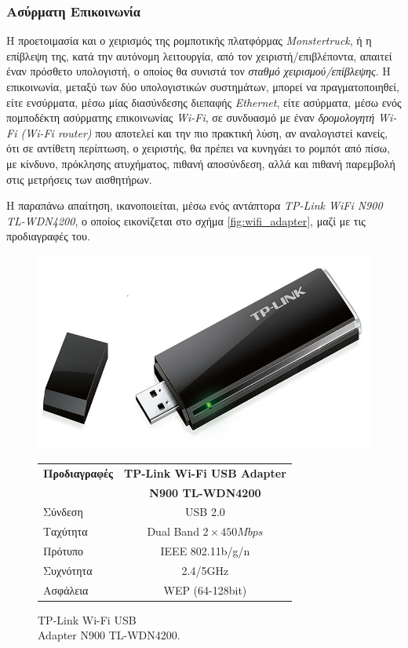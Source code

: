 \bigskip
\subsubsection{Ασύρματη Επικοινωνία}
Η προετοιμασία και ο χειρισμός της ρομποτικής πλατφόρμας \textit{Monstertruck}, ή η επίβλεψη της, κατά την αυτόνομη λειτουργία, από τον χειριστή/επιβλέποντα, απαιτεί έναν πρόσθετο υπολογιστή, ο οποίος θα συνιστά τον \textit{σταθμό χειρισμού/επίβλεψης}. Η επικοινωνία, μεταξύ των δύο υπολογιστικών συστημάτων, μπορεί να πραγματοποιηθεί, είτε ενσύρματα, μέσω μίας διασύνδεσης διεπαφής \textit{Ethernet}, είτε ασύρματα, μέσω ενός πομποδέκτη ασύρματης επικοινωνίας \textit{Wi-Fi}, σε συνδυασμό με έναν \textit{δρομολογητή Wi-Fi (Wi-Fi router)} που αποτελεί και την πιο πρακτική λύση, αν αναλογιστεί κανείς, ότι σε αντίθετη περίπτωση, ο χειριστής, θα πρέπει να κυνηγάει το ρομπότ από πίσω, με κίνδυνο, πρόκλησης ατυχήματος, πιθανή αποσύνδεση, αλλά και πιθανή παρεμβολή στις μετρήσεις των αισθητήρων.

\bigskip
Η παραπάνω απαίτηση, ικανοποιείται, μέσω ενός αντάπτορα \textit{TP-Link WiFi N900 TL-WDN4200}, ο οποίος εικονίζεται στο σχήμα \ref{fig:wifi_adapter}, μαζί με τις προδιαγραφές του.

\bigskip
\begin{figure}[!ht]
	\begin{minipage}[b]{0.4\textwidth}
		\centering
		\includegraphics[width=0.6\linewidth]{Chapters/Chapter2/Figures/wifi_adapter.png}
		\caption{TP-Link Wi-Fi USB\\ Adapter N900 TL-WDN4200.}
		\label{fig:wifi_adapter}
	\end{minipage}		
	\begin{minipage}[b]{0.5\textwidth}
		\centering
		\begin{tabular}{| l | c |}
			\hline
			\textbf{Προδιαγραφές} & \textbf{TP-Link Wi-Fi USB Adapter}\\
			 &  \textbf{N900 TL-WDN4200}\\ \hline
			Σύνδεση & USB 2.0 \\ \hline
			Ταχύτητα & Dual Band $2 \times 450Mbps$\\ \hline
			Πρότυπο & IEEE 802.11b/g/n\\ \hline
			Συχνότητα & 2.4/5GHz\\ \hline
			Ασφάλεια & WEP (64-128bit)\\ \hline
		\end{tabular}
		\label{tab:wifi_adapter_specs}
	\end{minipage}
\end{figure}


